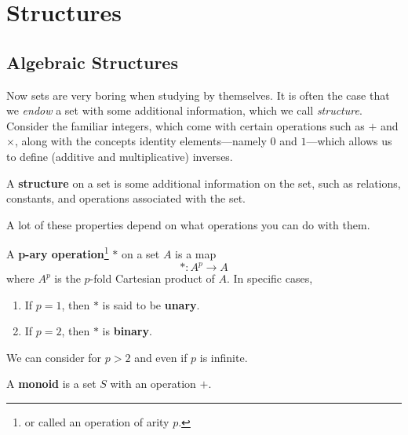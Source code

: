 \section{Structures} 

\subsection{Algebraic Structures}

  Now sets are very boring when studying by themselves. It is often the case that we \textit{endow} a set with some additional information, which we call \textit{structure}. Consider the familiar integers, which come with certain operations such as $+$ and $\times$, along with the concepts identity elements---namely $0$ and $1$---which allows us to define (additive and multiplicative) inverses. 

  \begin{definition}[Structure]
    A \textbf{structure} on a set is some additional information on the set, such as relations, constants, and operations associated with the set. 
  \end{definition} 

  A lot of these properties depend on what operations you can do with them.  

  \begin{definition}[Operation]
    A \textbf{p-ary operation}\footnote{or called an operation of arity $p$.} $\ast$ on a set $A$ is a map 
    \begin{equation}
      \ast : A^p \longrightarrow A
    \end{equation} 
    where $A^p$ is the $p$-fold Cartesian product of $A$. In specific cases, 
    \begin{enumerate}
      \item If $p = 1$, then $\ast$ is said to be \textbf{unary}. 
      \item If $p = 2$, then $\ast$ is \textbf{binary}. 
    \end{enumerate}
    We can consider for $p > 2$ and even if $p$ is infinite.  
  \end{definition}

  \begin{definition}[Monoid]
    A \textbf{monoid} is a set $S$ with an operation $+$. 
  \end{definition}

  \begin{definition}[Group]
    
  \end{definition}


